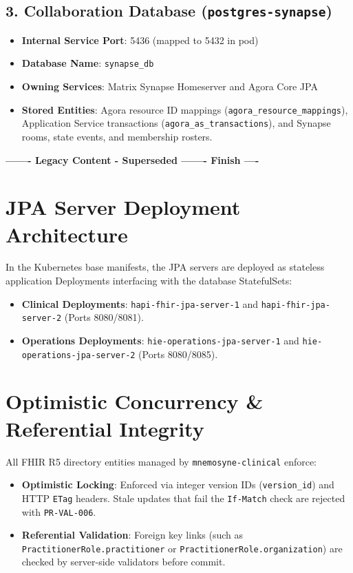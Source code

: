 \subsection{3. Collaboration Database (\texttt{postgres-synapse})}
\begin{itemize}
    \item \textbf{Internal Service Port}: 5436 (mapped to 5432 in pod)
    \item \textbf{Database Name}: \texttt{synapse\_db}
    \item \textbf{Owning Services}: Matrix Synapse Homeserver and Agora Core JPA
    \item \textbf{Stored Entities}: Agora resource ID mappings (\nolinkurl{agora_resource_mappings}), Application Service transactions (\nolinkurl{agora_as_transactions}), and Synapse rooms, state events, and membership rosters.
\end{itemize}


\par\noindent\textbf{------- Legacy Content - Superseded ------- Finish ----}

\section{JPA Server Deployment Architecture}

In the Kubernetes base manifests, the JPA servers are deployed as stateless application Deployments interfacing with the database StatefulSets:
\begin{itemize}
    \item \textbf{Clinical Deployments}: \texttt{hapi-fhir-jpa-server-1} and \texttt{hapi-fhir-jpa-server-2} (Ports 8080/8081).
    \item \textbf{Operations Deployments}: \texttt{hie-operations-jpa-server-1} and \texttt{hie-operations-jpa-server-2} (Ports 8080/8085).
\end{itemize}

\section{Optimistic Concurrency \& Referential Integrity}

All FHIR R5 directory entities managed by \texttt{mnemosyne-clinical} enforce:
\begin{itemize}
    \item \textbf{Optimistic Locking}: Enforced via integer version IDs (\nolinkurl{version_id}) and HTTP \texttt{ETag} headers. Stale updates that fail the \texttt{If-Match} check are rejected with \texttt{PR-VAL-006}.
    \item \textbf{Referential Validation}: Foreign key links (such as \nolinkurl{PractitionerRole.practitioner} or \nolinkurl{PractitionerRole.organization}) are checked by server-side validators before commit.
\end{itemize}

\newpage
